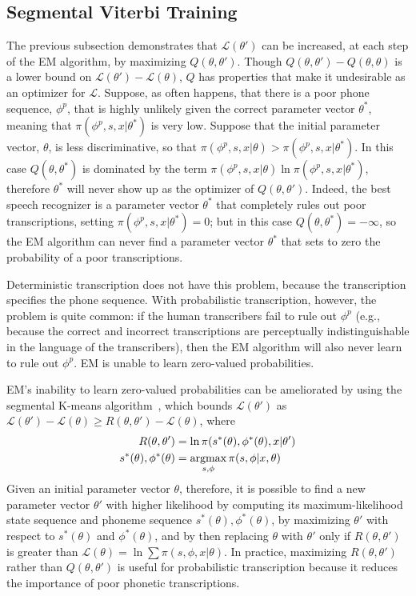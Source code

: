 \subsection{Segmental Viterbi Training}

The previous subsection demonstrates that ${\mathcal L}(\theta')$ can
be increased, at each step of the EM algorithm, by maximizing
$Q(\theta,\theta')$.  Though $Q(\theta,\theta')-Q(\theta,\theta)$ is a
lower bound on ${\mathcal L}(\theta')-{\mathcal L}(\theta)$, $Q$
has properties that make it undesirable as an optimizer for ${\mathcal
  L}$.  Suppose, as often happens, that there is a poor phone
sequence, $\phi^p$, that is highly unlikely given the correct
parameter vector $\theta^*$, meaning that $\pi(\phi^p,s,x|\theta^*)$
is very low.  Suppose that the initial parameter vector, $\theta$, is
less discriminative, so that
$\pi(\phi^p,s,x|\theta)>\pi(\phi^p,s,x|\theta^*)$.  In this case
$Q(\theta,\theta^*)$ is dominated by the term
$\pi(\phi^p,s,x|\theta)\ln\pi(\phi^p,s,x|\theta^*)$, therefore
$\theta^*$ will never show up as the optimizer of $Q(\theta,\theta')$.
Indeed, the best speech recognizer is a parameter vector $\theta^*$
that completely rules out poor transcriptions, setting
$\pi(\phi^p,s,x|\theta^*)=0$; but in this case
$Q(\theta,\theta^*)=-\infty$, so the EM algorithm can never find a
parameter vector $\theta^*$ that sets to zero the probability of a
poor transcriptions.

Deterministic transcription does not have this problem, because the
transcription specifies the phone sequence.  With probabilistic
transcription, however, the problem is quite common: if the
human transcribers fail to rule out $\phi^p$ (e.g., because the
correct and incorrect transcriptions are perceptually
indistinguishable in the language of the transcribers), then the EM
algorithm will also never learn to rule out $\phi^p$.  EM is unable
to learn zero-valued probabilities.

EM's inability to learn zero-valued probabilities can be ameliorated
by using the segmental K-means algorithm~\cite{Juang1990}, which
bounds ${\mathcal L}(\theta')$ as
$\mathcal{L}(\theta')-\mathcal{L}(\theta)\ge
R(\theta,\theta')-\mathcal{L}(\theta)$, where
\begin{align}
  R(\theta,\theta') &= \ln \pi(s^*(\theta),\phi^*(\theta),x|\theta')\\
  s^*(\theta),\phi^*(\theta)&= \operatorname*{argmax}_{s,\phi} \pi(s,\phi|x,\theta)
\end{align}
Given an initial parameter vector $\theta$, therefore, it is possible
to find a new parameter vector $\theta'$ with higher likelihood by
computing its maximum-likelihood state sequence and phoneme sequence
$s^*(\theta),\phi^*(\theta)$, by maximizing $\theta'$ with respect to
$s^*(\theta)$ and $\phi^*(\theta)$, and by then replacing $\theta$
with $\theta'$ only if $R(\theta,\theta')$ is greater than ${\mathcal
  L}(\theta)=\ln \sum\pi(s,\phi,x|\theta)$.  In practice, maximizing
$R(\theta,\theta')$ rather than $Q(\theta,\theta')$ is useful for
probabilistic transcription because it reduces the importance of poor
phonetic transcriptions.
